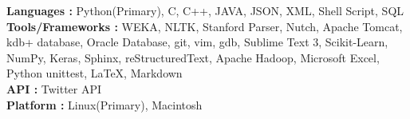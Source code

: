 
\textbf{Languages :}  Python(Primary), C, C++, JAVA, JSON, XML, Shell Script, SQL \\
\textbf{Tools/Frameworks :} WEKA, NLTK, Stanford Parser, Nutch, Apache Tomcat, kdb+ database, Oracle Database, git, vim, gdb, Sublime Text 3, Scikit-Learn, NumPy, Keras, Sphinx, reStructuredText, Apache Hadoop,
Microsoft Excel, Python unittest, \LaTeX, Markdown\\
\textbf{API :} Twitter API \\
\textbf{Platform :} Linux(Primary), Macintosh